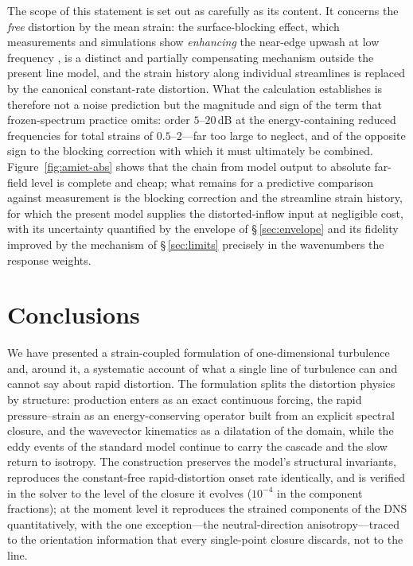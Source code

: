 \documentclass[11pt,a4paper]{article}
\begin{document}
The scope of this statement is set out as carefully as its content.
It concerns the \emph{free} distortion by the mean strain: the
surface-blocking effect, which measurements and simulations show
\emph{enhancing} the near-edge upwash at low frequency
\citep{HuntGraham1978,dosSantos2023,Piccolo2024}, is a distinct and
partially compensating mechanism outside the present line model, and
the strain history along individual streamlines is replaced by the
canonical constant-rate distortion. What the calculation establishes
is therefore not a noise prediction but the magnitude and sign of the
term that frozen-spectrum practice omits: order $5$--$20$\,dB at the
energy-containing reduced frequencies for total strains of
$0.5$--$2$---far too large to neglect, and of the opposite sign to the
blocking correction with which it must ultimately be combined.
Figure~\ref{fig:amiet-abs} shows that the chain from model output to
absolute far-field level is complete and cheap; what remains for a
predictive comparison against measurement is the blocking correction
and the streamline strain history, for which the present model
supplies the distorted-inflow input at negligible cost, with its
uncertainty quantified by the envelope of \S\,\ref{sec:envelope} and
its fidelity improved by the mechanism of \S\,\ref{sec:limits}
precisely in the wavenumbers the response weights.

\section{Conclusions}\label{sec:conclusions}

We have presented a strain-coupled formulation of one-dimensional
turbulence and, around it, a systematic account of what a single line of
turbulence can and cannot say about rapid distortion. The formulation
splits the distortion physics by structure: production enters as an
exact continuous forcing, the rapid pressure--strain as an
energy-conserving operator built from an explicit spectral closure, and
the wavevector kinematics as a dilatation of the domain, while the eddy
events of the standard model continue to carry the cascade and the slow
return to isotropy. The construction preserves the model's structural
invariants, reproduces the constant-free rapid-distortion onset rate
identically, and is verified in the solver to the level of the closure
it evolves ($10^{-4}$ in the component fractions); at the moment level
it reproduces the strained components of the \citet{LeeReynolds1985}
DNS quantitatively, with the one exception---the neutral-direction
anisotropy---traced to the orientation information that every
single-point closure discards, not to the line.
\end{document}
